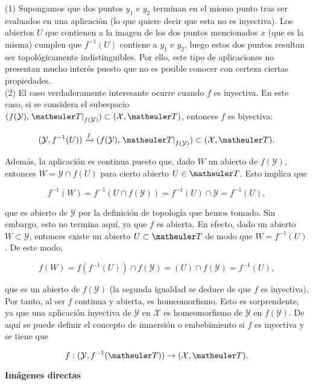 \begin{obs}[Inyectividad]

(1) Supongamos que dos puntos $y_1$ e $y_2$ terminan en el mismo punto tras ser evaluados en una aplicación (lo que quiere decir que esta no es inyectiva). Los abiertos $U$ que contienen a la imagen de los dos puntos mencionados $x$ (que es la misma) cumplen que $f^{-1}(U)$ contiene a $y_1$ e $y_2$, luego estos dos puntos resultan ser topológicamente indistinguibles. Por ello, este tipo de aplicaciones no presentan mucho interés puesto que no es posible conocer con certeza ciertas propiedades. \\

(2) El caso verdaderamente interesante ocurre cuando $f$ es inyectiva. En este caso, si se considera el subespacio $(f(\mathcal{Y}),\left.\T\right|_{f(\mathcal{Y})}) \subset (\mathcal{X},\T)$, entonces $f$ es biyectiva:

\[(\mathcal{Y},f^{-1}(U)) \xrightarrow{f} (f(\mathcal{Y}),\left.\T\right|_{f(\mathcal{Y})}) \subset (\mathcal{X},\T).\]

Además, la aplicación es continua puesto que, dado $W$ un abierto de $f(\mathcal{Y})$, entonces $W=\mathcal{Y}\cap f(U)$ para cierto abierto $U\in \T$. Esto implica que

\[f^{-1}(W)=f^{-1}(U\cap f(\mathcal{Y}))=f^{-1}(U)\cap \mathcal{Y}=f^{-1}(U),\]

que es abierto de $\mathcal{Y}$ por la definición de topología que hemos tomado. Sin embargo, esto no termina aquí, ya que $f$ es abierta. En efecto, dado un abierto $W\subset \mathcal{Y}$, entonces existe un abierto $U\subset \T$ de modo que $W=f^{-1}(U)$. De este modo, 

\[f(W)=f(f^{-1}(U))\cap f(\mathcal{Y})=(U)\cap f(\mathcal{Y})=f^{-1}(U),\]

que es un abierto de $f(\mathcal{Y})$ (la segunda igualdad se deduce de que $f$ es inyectiva). Por tanto, al ser $f$ continua y abierta, es homeomorfismo. Esto es sorprendente, ya que una aplicación inyectiva de $\mathcal{Y}$ en $\mathcal{X}$ es homeomorfismo de $\mathcal{Y}$ en $f(\mathcal{Y})$. De aquí se puede definir el concepto de inmersión o embebimiento si $f$ es inyectiva y se tiene que 

\[f:(\mathcal{Y},f^{-1}(\T)) \to (\mathcal{X},\T).\]

\end{obs}

\textbf{Imágenes directas} \\

